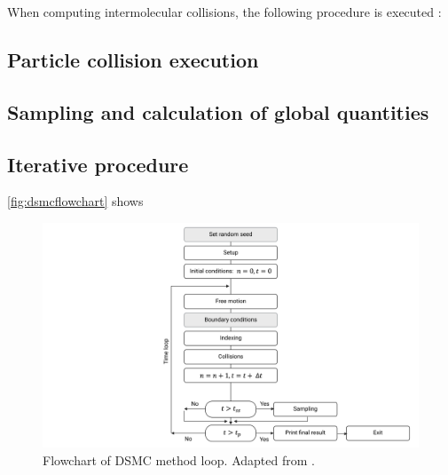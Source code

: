 When computing intermolecular collisions, the following procedure is executed \cite{bird, themontecarlo}:



\subsection{Particle collision execution}

\subsection{Sampling and calculation of global quantities}
\label{subsection:sampling}

\subsection{Iterative procedure}
\autoref{fig:dsmcflowchart} shows 

\begin{figure}[ht]
    \centering
    \includegraphics[width=\textwidth]{../Images/3. Methodology/dsmcflowchart.pdf}
    \caption{Flowchart of DSMC method loop. Adapted from \cite{dsmcnotes}.}
    \label{fig:dsmcflowchart}
\end{figure}